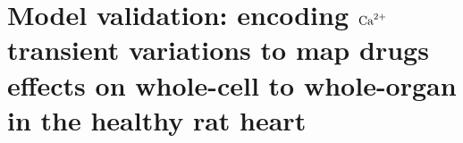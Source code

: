 \chapter{Model validation: encoding $\textrm{Ca}^{2+}$ transient variations to map drugs 
effects on whole-cell to whole-organ in the healthy rat 
heart}\label{cha:chapter6}
%
%
%


